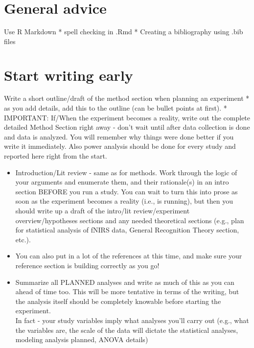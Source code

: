 \documentclass[
]{book}
\begin{document}
\hypertarget{general-advice-1}{%
\section{General advice}\label{general-advice-1}}

Use R Markdown
* spell checking in .Rmd
* Creating a bibliography using .bib files

\hypertarget{start-writing-early}{%
\section{Start writing early}\label{start-writing-early}}

Write a short outline/draft of the method section when planning an experiment
* as you add details, add this to the outline (can be bullet points at first).
* IMPORTANT: If/When the experiment becomes a reality, write out the complete detailed Method Section right away - don't wait until after data collection is done and data is analyzed. You will remember why things were done better if you write it immediately. Also power analysis should be done for every study and reported here right from the start.

\begin{itemize}
\item
  Introduction/Lit review - same as for methods. Work through the logic of your arguments and enumerate them, and their rationale(s) in an intro section BEFORE you run a study. You can wait to turn this into prose as soon as the experiment becomes a reality (i.e., is running), but then you should write up a draft of the intro/lit review/experiment overview/hypotheses sections and any needed theoretical sections (e.g., plan for statistical analysis of fNIRS data, General Recognition Theory section, etc.).
\item
  You can also put in a lot of the references at this time, and make sure your reference section is building correctly as you go!
\item
  Summarize all PLANNED analyses and write as much of this as you can ahead of time too. This will be more tentative in terms of the writing, but the analysis itself should be completely knowable before starting the experiment.\\
  In fact - your study variables imply what analyses you'll carry out (e.g., what the variables are, the scale of the data will dictate the statistical analyses, modeling analysis planned, ANOVA details)
\end{itemize}
\end{document}
